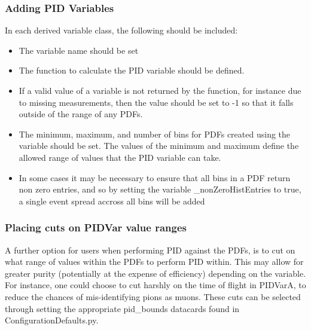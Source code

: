 \subsubsection{Adding PID Variables}
\label{addvar}
In each derived variable class, the following should be included:
\begin{itemize}
\item The variable name should be set
\item The function to calculate the PID variable should be defined.  
\item If a valid value of a variable is not returned by the function, for instance due to missing measurements, then the value should be set to -1 so that it falls outside of the range of any PDFs.
\item The minimum, maximum, and number of bins for PDFs created using 
the variable should be set. The values of the minimum and maximum 
define the allowed range of values that the PID variable can take.
\item In some cases it may be necessary to ensure that all bins in a 
PDF return non zero entries, and so by setting the variable 
\_nonZeroHistEntries to true, a single event spread accross all bins 
will be added
\end{itemize}

\subsubsection{Placing cuts on PIDVar value ranges}
A further option for users when performing PID against the PDFs, is to cut on what range of values within the PDFs to perform PID within. This may allow for greater purity (potentially at the expense of efficiency) depending on the variable. For instance, one could choose to cut harshly on the time of flight in PIDVarA, to reduce the chances of mis-identifying pions as muons. These cuts can be selected through setting the appropriate pid\_bounds datacards found in ConfigurationDefaults.py.
